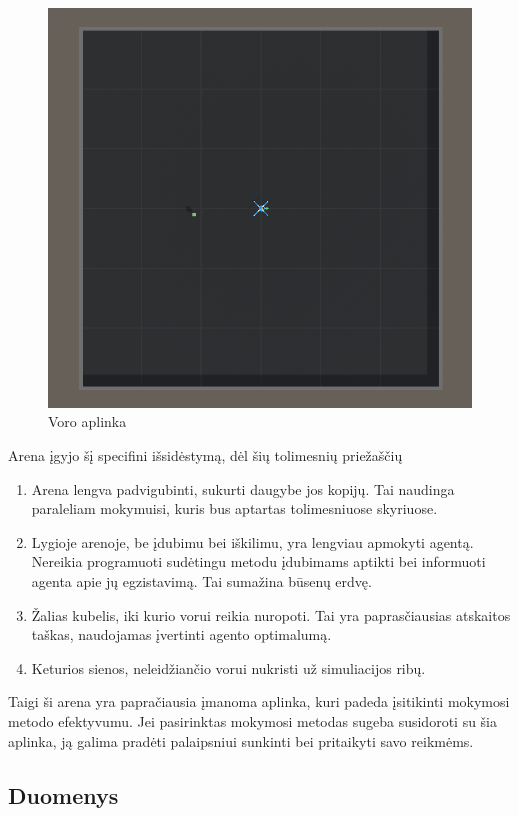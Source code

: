 \documentclass[a4paper, 12pt]{article}
\begin{document}
\begin{figure}[h!]
\centering
\includegraphics[width=.7\textwidth]{arena}
\caption{Voro aplinka}
\label{arena}
\end{figure}

Arena įgyjo šį specifini išsidėstymą, dėl šių tolimesnių priežaščių

\begin{enumerate}
  \addtolength{\itemsep}{-0.5\baselineskip} 
  \item Arena lengva padvigubinti, sukurti daugybe jos kopijų. Tai naudinga paraleliam mokymuisi, kuris bus aptartas tolimesniuose skyriuose.
  \item Lygioje arenoje, be įdubimu bei iškilimu, yra lengviau apmokyti agentą. Nereikia programuoti sudėtingu metodu įdubimams aptikti bei informuoti agenta apie jų egzistavimą. Tai sumažina būsenų erdvę.
  \item Žalias kubelis, iki kurio vorui reikia nuropoti. Tai yra paprasčiausias atskaitos taškas, naudojamas įvertinti agento optimalumą.
  \item Keturios sienos, neleidžiančio vorui nukristi už simuliacijos ribų.
\end{enumerate}

Taigi ši arena yra papračiausia įmanoma aplinka, kuri padeda įsitikinti mokymosi metodo efektyvumu. Jei pasirinktas mokymosi metodas sugeba susidoroti su šia aplinka, ją galima pradėti palaipsniui sunkinti bei pritaikyti savo reikmėms.

\subsection{Duomenys}
\end{document}
